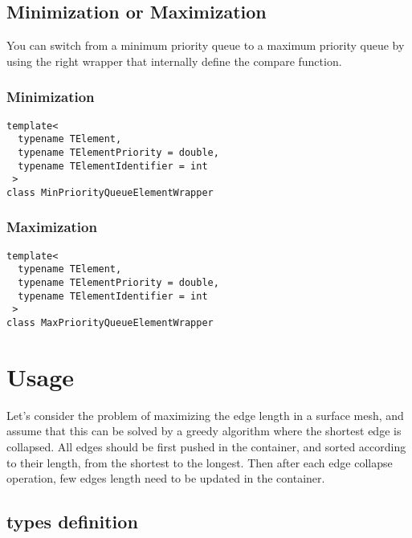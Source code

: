 \documentclass{InsightArticle}
\begin{document}
\subsection{Minimization or Maximization}

You can switch from a minimum priority queue to a maximum priority queue by using the right wrapper that internally define the compare function.

\subsubsection{Minimization}

\begin{verbatim}
template<
  typename TElement,
  typename TElementPriority = double,
  typename TElementIdentifier = int
 >
class MinPriorityQueueElementWrapper
\end{verbatim}

\subsubsection{Maximization}
\begin{verbatim}
template<
  typename TElement,
  typename TElementPriority = double,
  typename TElementIdentifier = int
 >
class MaxPriorityQueueElementWrapper
\end{verbatim}

\section{Usage}

Let's consider the problem of maximizing the edge length in a surface mesh, and assume that this can be solved by a greedy algorithm where the shortest edge is collapsed. All edges should be first pushed in the container, and sorted according to their length, from the shortest to the longest. Then after each edge collapse operation, few edges length need to be updated in the container.

\subsection{types definition}
\end{document}
